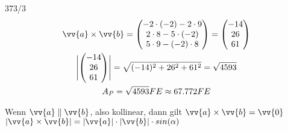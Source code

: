\begin{exercise}{373/3}
\begin{gather*}
    \vv{a} \times \vv{b} = \begin{pmatrix}-2 \cdot (-2) - 2 \cdot 9 \\ 2 \cdot 8 - 5 \cdot (-2) \\ 5 \cdot 9 - (-2) \cdot 8\end{pmatrix} = \begin{pmatrix}-14 \\ 26 \\ 61\end{pmatrix} \\
    \Biggl|\begin{pmatrix}-14 \\ 26 \\ 61\end{pmatrix}\Biggr| = \sqrt{(-14)^2 + 26^2 + 61^2} = \sqrt{4593} \\
    A_P = \sqrt{4593}FE \approx 67.772FE
  \end{gather*}
\end{exercise}
Wenn $\vv{a} \parallel \vv{b}$, also kollinear, dann gilt $\vv{a} \times \vv{b} = \vv{0}$ \\
$|\vv{a} \times \vv{b}| = |\vv{a}| \cdot |\vv{b}| \cdot sin(\alpha)$
